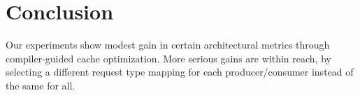 \section{Conclusion}

Our experiments show modest gain in certain architectural metrics through compiler-guided cache optimization. More serious gains are within reach, by selecting a different request type mapping for each producer/consumer instead of the same for all.